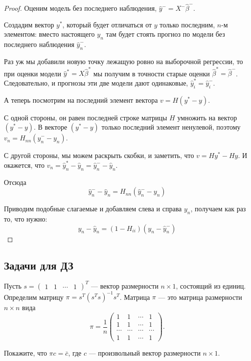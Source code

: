\documentclass[12pt]{article}
\newcommand{\hb}{\hat{\beta}}
\begin{document}
\begin{proof}
Оценим модель без последнего наблюдения, $\hat y^{-} = X^{-} \hb^{-}$. 

Создадим вектор $y^{*}$, который будет отличаться от $y$ только последним, $n$-м элементом:
вместо настоящего $y_n$ там будет стоять прогноз по модели без последнего наблюдения $\hat y^{-}_n$.

Раз уж мы добавили новую точку лежащую ровно на выборочной регрессии, то при оценки модели
$\hat y^* = X \hat \beta^*$ мы получим в точности старые оценки $\hat \beta^* = \hat \beta^-$. 
Следовательно, и прогнозы эти две модели дают одинаковые, $\hat y_i^* = \hat y_i^-$.

А теперь посмотрим на последний элемент вектора $v = H (y^* - y)$.

С одной стороны, он равен последней строке матрицы $H$ умножить на вектор $(y^* - y)$. 
В векторе $(y^* - y)$ только последний элемент ненулевой, поэтому $v_n = H_{nn} (\hat y^{-}_n - y_n)$.

С другой стороны, мы можем раскрыть скобки, и заметить, что $v = Hy^* - Hy$. 
И окажется, что $v_n = \hat y_n^* - \hat y_n = \hat y_n^- - \hat y_n$.

Отсюда
\[
 \hat y_n^- - \hat y_n = H_{nn} (\hat y_n^- - y_n)
\]

Приводим подобные слагаемые и добавляем слева и справа $y_n$, получаем как раз то, что нужно:
\[
y_n - \hat y_n   = (1 - H_{ii}) (y_n - \hat y_n^- )
\]
\end{proof}


\subsection{Задачи для ДЗ}
\begin{problem}
Пусть 
$s = 
 \begin{pmatrix}
  1 & 1 & \cdots & 1
 \end{pmatrix}^{T}$ — вектор размерности $n \times 1$, состоящий из единиц.
Определим матрицу $\pi = s^{T}(s^{T}s)^{-1}s^{T}$. Матрица $\pi$ — это матрица размерности $n \times n$ вида
\[
\pi = \frac{1}{n}
 \begin{pmatrix}
  1 & 1 & \cdots & 1\\
  1 & 1 & \cdots & 1\\
  \cdots & \cdots & \cdots & \cdots \\
  1 & 1 & \cdots & 1
 \end{pmatrix}.
 \]
 
Покажите, что $\pi c = \bar c$, где $c$ — произвольный вектор размерности $n \times 1$.
\end{problem}
\end{document}
